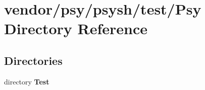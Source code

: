 \section{vendor/psy/psysh/test/\+Psy Directory Reference}
\label{dir_9e8bf48d11103a4dede522bd6c198f36}
\subsection*{Directories}
\begin{DoxyCompactItemize}
\item 
directory {\bf Test}
\end{DoxyCompactItemize}
